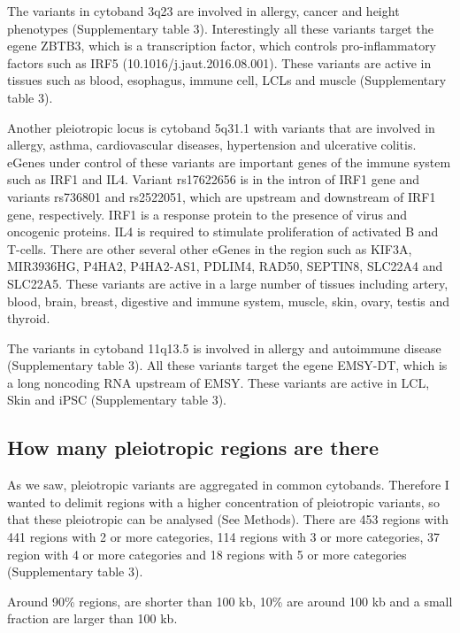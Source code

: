 The variants in cytoband 3q23 are involved in allergy, cancer and height phenotypes (Supplementary table 3).
%
Interestingly all these variants target the egene ZBTB3, which is a transcription factor, which controls pro-inflammatory factors such as IRF5 (10.1016/j.jaut.2016.08.001).
%
These variants are active in tissues such as blood, esophagus, immune cell, LCLs and muscle (Supplementary table 3).

Another pleiotropic locus is cytoband 5q31.1 with variants that are involved in allergy, asthma, cardiovascular diseases, hypertension and ulcerative colitis.
%
eGenes under control of these variants are important genes of the immune system such as IRF1 and IL4.
%
Variant rs17622656 is in the intron of IRF1 gene and variants rs736801 and rs2522051, which are upstream and downstream of IRF1 gene, respectively.
%
IRF1 is a response protein to the presence of virus and oncogenic proteins.
%
IL4 is required to stimulate proliferation of activated B and T-cells.
%
There are other several other eGenes in the region such as KIF3A, MIR3936HG, P4HA2, P4HA2-AS1, PDLIM4, RAD50, SEPTIN8, SLC22A4 and SLC22A5.
%
These variants are active in a large number of tissues including artery, blood, brain, breast, digestive and immune system, muscle, skin, ovary, testis and thyroid.

The variants in cytoband 11q13.5 is involved in allergy and autoimmune disease (Supplementary table 3).
%
All these variants target the egene EMSY-DT, which is a long noncoding RNA upstream of EMSY.
%
These variants are active in LCL, Skin and iPSC (Supplementary table 3).

\subsection*{How many pleiotropic regions are there}

As we saw, pleiotropic variants are aggregated in common cytobands.
%
Therefore I wanted to delimit regions with a higher concentration of pleiotropic variants, so that these pleiotropic can be analysed (See Methods).
%
There are 453 regions with 441 regions with 2 or more categories, 114 regions with 3 or more categories, 37 region with 4 or more categories and 18 regions with 5 or more categories (Supplementary table 3).


Around 90\% regions, are shorter than 100 kb, 10\% are around 100 kb and a small fraction are larger than 100 kb.

